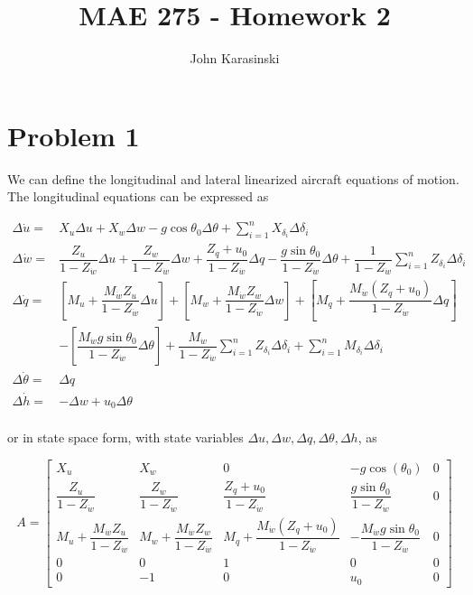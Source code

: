 \documentclass[12pt]{article}
\title{MAE 275 - Homework 2}
\author{John Karasinski}
\begin{document}
\maketitle

\section{Problem 1}
We can define the longitudinal and lateral linearized aircraft equations of motion. The longitudinal equations can be expressed as

\begin{equation}
\begin{split}
\Delta \dot{u} = &X_u \Delta u + X_w \Delta w - g\cos \theta_0 \Delta \theta + \sum\limits_{i=1}^n X_{\delta_i} \Delta \delta_i \\
\Delta \dot{w} = &\dfrac{Z_u}{1-Z_{\dot{w}}} \Delta u +
                  \dfrac{Z_w}{1-Z_{\dot{w}}} \Delta w +
                  \dfrac{Z_q + u_0}{1-Z_{\dot{w}}} \Delta q -
                  \dfrac{g\sin \theta_0}{1-Z_{\dot{w}}} \Delta \theta +
                  \dfrac{1}{1-Z_{\dot{w}}} \sum\limits_{i=1}^n Z_{\delta_i} \Delta \delta_i \\
\Delta \dot{q} = &\left[ M_u + \dfrac{M_{\dot{w}} Z_u}{1-Z_{\dot{w}}} \Delta u  \right] +
                  \left[ M_w + \dfrac{M_{\dot{w}} Z_w}{1-Z_{\dot{w}}} \Delta w  \right] +
                  \left[ M_q + \dfrac{M_{\dot{w}} (Z_q + u_0)}{1-Z_{\dot{w}}} \Delta q  \right] \\
                 & - \left[ \dfrac{M_{\dot{w}} g\sin \theta_0}{1-Z_{\dot{w}}} \Delta \theta  \right]
                   + \dfrac{M_{\dot{w}}}{1-Z_{\dot{w}}} \sum\limits_{i=1}^n Z_{\delta_i} \Delta \delta_i
                   + \sum\limits_{i=1}^n M_{\delta_i} \Delta \delta_i \\
\Delta \dot{\theta} = &\Delta q \\
\Delta \dot{h} = &-\Delta w + u_0 \Delta \theta \\
\end{split}
\label{long}
\end{equation}

\noindent or in state space form, with state variables $\Delta u, \Delta w, \Delta q, \Delta \theta, \Delta h $, as

\begin{equation*}
A =
\begin{bmatrix}
    X_u & X_w & 0 & -g \cos(\theta_0) & 0 \\
    \dfrac{Z_u}{1-Z_{\dot{w}}} & \dfrac{Z_w}{1-Z_{\dot{w}}} & \dfrac{Z_q + u_0}{1-Z_{\dot{w}}} & \dfrac{g\sin \theta_0}{1-Z_{\dot{w}}} & 0 \\
    M_u + \dfrac{M_{\dot{w}} Z_u}{1-Z_{\dot{w}}} & M_w + \dfrac{M_{\dot{w}} Z_w}{1-Z_{\dot{w}}} & M_q + \dfrac{M_{\dot{w}} (Z_q + u_0)}{1-Z_{\dot{w}}} & -\dfrac{M_{\dot{w}} g\sin \theta_0}{1-Z_{\dot{w}}} & 0 \\
    0 & 0 & 1 & 0 & 0 \\
    0 & -1 & 0 & u_0 & 0
\end{bmatrix}
\end{equation*}
\end{document}
